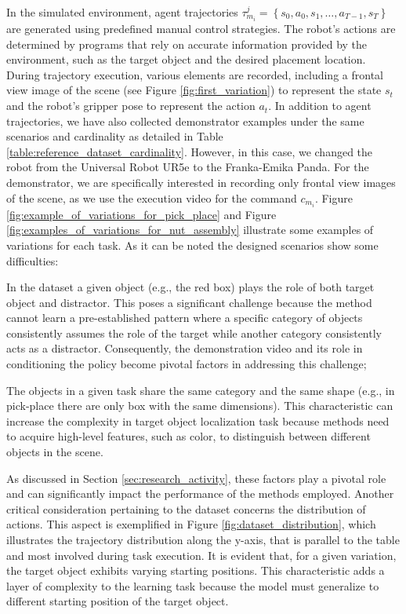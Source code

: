 In the simulated environment, agent trajectories $\tau^{j}_{m_{i}} = \left \{ s_{0}, a_{0}, s_{1},\dots, a_{T-1}, s_{T}\right \}$ are generated using predefined manual control strategies. The robot's actions are determined by programs that rely on accurate information provided by the environment, such as the target object and the desired placement location. During trajectory execution, various elements are recorded, including a frontal view image of the scene (see Figure \ref{fig:first_variation}) to represent the state $s_{t}$ and the robot's gripper pose to represent the action $a_{t}$. In addition to agent trajectories, we have also collected demonstrator examples under the same scenarios and cardinality as detailed in Table \ref{table:reference_dataset_cardinality}. However, in this case, we changed the robot from the Universal Robot UR5e to the Franka-Emika Panda. For the demonstrator, we are specifically interested in recording only frontal view images of the scene, as we use the execution video for the command $c_{m_{i}}$. Figure \ref{fig:example_of_variations_for_pick_place} and Figure \ref{fig:examples_of_variations_for_nut_assembly} illustrate some examples of variations for each task.
As it can be noted the designed scenarios show some difficulties:
\begin{itemize*}[label=$(\bullet)$]
    \item In the dataset a given object (e.g., the red box) plays the role of both target object and distractor. This poses a significant challenge because the method cannot learn a pre-established pattern where a specific category of objects consistently assumes the role of the target while another category consistently acts as a distractor. Consequently, the demonstration video and its role in conditioning the policy become pivotal factors in addressing this challenge;
    \item The objects in a given task share the same category and the same shape (e.g., in pick-place there are only box with the same dimensions). This characteristic can increase the complexity in target object localization task because methods need to acquire high-level features, such as color, to distinguish between different objects in the scene.
\end{itemize*}

\noindent As discussed in Section \ref{sec:research_activity}, these factors play a pivotal role and can significantly impact the performance of the methods employed.
Another critical consideration pertaining to the dataset concerns the distribution of actions. This aspect is exemplified in Figure \ref{fig:dataset_distribution}, which illustrates the trajectory distribution along the y-axis, that is parallel to the table and most involved during task execution. It is evident that, for a given variation, the target object exhibits varying starting positions. This characteristic adds a layer of complexity to the learning task because the model must generalize to different starting position of the target object.



